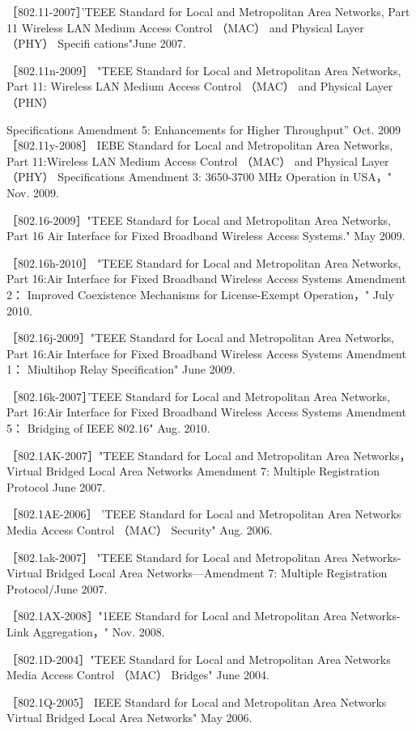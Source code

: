 ［802.11-2007］'TEEE Standard for Local and Metropolitan Area Networks, Part 11
Wireless LAN Medium Access Control （MAC） and Physical Layer （PHY） Specifi
cations"June 2007.

［802.11n-2009］ "TEEE Standard for Local and Metropolitan Area Networks, Part
11: Wireless LAN Medium Access Control （MAC） and Physical Layer （PHN）

Specifications Amendment 5: Enhancements for Higher Throughput” Oct. 2009
［802.11y-2008］ IEBE Standard for Local and Metropolitan Area Networks, Part
11:Wireless LAN Medium Access Control （MAC） and Physical Layer （PHY）
Specifications Amendment 3: 3650-3700 MHz Operation in USA，" Nov. 2009.

［802.16-2009］"TEEE Standard for Local and Metropolitan Area Networks, Part 16
Air Interface for Fixed Broadband Wireless Access Systems." May 2009.

［802.16h-2010］ "TEEE Standard for Local and Metropolitan Area Networks, Part
16:Air Interface for Fixed Broadband Wireless Access Systems Amendment 2：
Improved Coexistence Mechanisms for License-Exempt Operation，" July 2010.

［802.16j-2009］"TEEE Standard for Local and Metropolitan Area Networks, Part
16:Air Interface for Fixed Broadband Wireless Access Systems Amendment 1：
Miultihop Relay Specification" June 2009.

［802.16k-2007］'TEEE Standard for Local and Metropolitan Area Networks, Part
16:Air Interface for Fixed Broadband Wireless Access Systems Amendment 5：
Bridging of IEEE 802.16" Aug. 2010.

［802.1AK-2007］"TEEE Standard for Local and Metropolitan Area Networks，
Virtual Bridged Local Area Networks Amendment 7: Multiple Registration
Protocol June 2007.

［802.1AE-2006］ 'TEEE Standard for Local and Metropolitan Area Networks
Media Access Control （MAC） Security" Aug. 2006.

［802.1ak-2007］ "TEEE Standard for Local and Metropolitan Area Networks-
Virtual Bridged Local Area Networks—Amendment 7: Multiple Registration
Protocol/June 2007.

［802.1AX-2008］"1EEE Standard for Local and Metropolitan Area Networks-
Link Aggregation，" Nov. 2008.

［802.1D-2004］"TEEE Standard for Local and Metropolitan Area Networks Media
Access Control （MAC） Bridges" June 2004.

［802.1Q-2005］ IEEE Standard for Local and Metropolitan Area Networks Virtual
Bridged Local Area Networks" May 2006.

